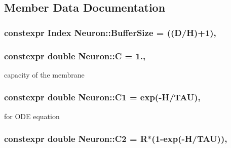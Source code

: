 \subsection{Member Data Documentation}
\hypertarget{classNeuron_a9c8a61b96478817e5c9f5731d08eb451}{
\subsubsection[{Buffer\-Size}]{\setlength{\rightskip}{0pt plus 5cm}constexpr {\bf Index} Neuron\-::\-Buffer\-Size = (({\bf D}/{\bf H})+1)\hspace{0.3cm}{\ttfamily [static]}, {\ttfamily [private]}}}\label{classNeuron_a9c8a61b96478817e5c9f5731d08eb451}
\hypertarget{classNeuron_a2daa8cbf7e36fda4de6b4fde70d86418}{
\subsubsection[{C}]{\setlength{\rightskip}{0pt plus 5cm}constexpr double Neuron\-::\-C = 1.\hspace{0.3cm}{\ttfamily [static]}, {\ttfamily [private]}}}\label{classNeuron_a2daa8cbf7e36fda4de6b4fde70d86418}


capacity of the membrane 

\hypertarget{classNeuron_ac5505a260c8593efa3bc9488ff3caf3c}{
\subsubsection[{C1}]{\setlength{\rightskip}{0pt plus 5cm}constexpr double Neuron\-::\-C1 = exp(-\/{\bf H}/{\bf T\-A\-U})\hspace{0.3cm}{\ttfamily [static]}, {\ttfamily [private]}}}\label{classNeuron_ac5505a260c8593efa3bc9488ff3caf3c}


for O\-D\-E equation 

\hypertarget{classNeuron_aa8eae585745810ad3473f0616ec349e0}{
\subsubsection[{C2}]{\setlength{\rightskip}{0pt plus 5cm}constexpr double Neuron\-::\-C2 = {\bf R}$\ast$(1-\/exp(-\/{\bf H}/{\bf T\-A\-U}))\hspace{0.3cm}{\ttfamily [static]}, {\ttfamily [private]}}}\label{classNeuron_aa8eae585745810ad3473f0616ec349e0}


